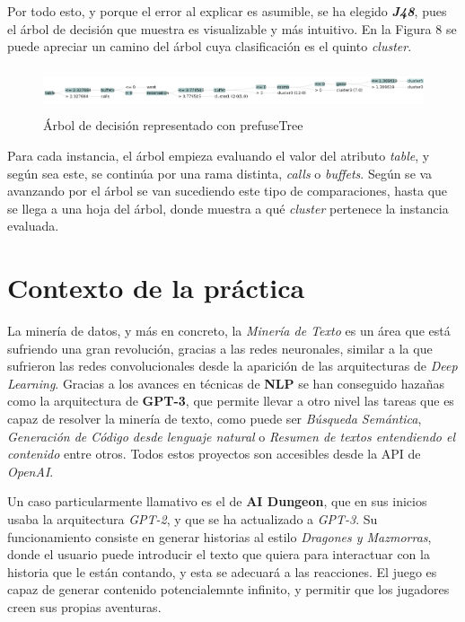 \documentclass[12pt,a4paper, xcolor=table]{article}
\begin{document}
\vspace{2mm}

Por todo esto, y porque el error al explicar es asumible, se ha elegido \textit{\textbf{J48}}, pues el árbol de decisión que muestra es visualizable y más intuitivo. En la Figura 8 se puede apreciar un camino del árbol cuya clasificación es el quinto \textit{cluster}.

\begin{figure}[!h]
  \centering
  \includegraphics[width=500px, height=50px]{img/arbol_decision.png}
  \caption{Árbol de decisión representado con prefuseTree\cite{weka}}
\end{figure}

Para cada instancia, el árbol empieza evaluando el valor del atributo \textit{table}, y según sea este, se continúa por una rama distinta, \textit{calls} o \textit{buffets}. Según se va avanzando por el árbol se van sucediendo este tipo de comparaciones, hasta que se llega a una hoja del árbol, donde muestra a qué \textit{cluster} pertenece la instancia evaluada.


\section{Contexto de la práctica}

La minería de datos, y más en concreto, la \textit{Minería de Texto} es un área que está sufriendo una gran revolución, gracias a las redes neuronales, similar a la que sufrieron las redes convolucionales desde la aparición de las arquitecturas de \textit{Deep Learning}. Gracias a los avances en técnicas de \textbf{NLP} se han conseguido hazañas como la arquitectura de \textbf{GPT-3}\cite{gpt3}, que permite llevar a otro nivel las tareas que es capaz de resolver la minería de texto, como puede ser \textit{Búsqueda Semántica}, \textit{Generación de Código desde lenguaje natural} o \textit{Resumen de textos entendiendo el contenido} entre otros. Todos estos proyectos son accesibles desde la API de \textit{OpenAI}\cite{openai}.

\vspace{3mm}

Un caso particularmente llamativo es el de \textbf{AI Dungeon}, que en sus inicios usaba la arquitectura \textit{GPT-2}, y que se ha actualizado a \textit{GPT-3}. Su funcionamiento consiste en generar historias al estilo \textit{Dragones y Mazmorras}, donde el usuario puede introducir el texto que quiera para interactuar con la historia que le están contando, y esta se adecuará a las reacciones. El juego es capaz de generar contenido potencialemnte infinito, y permitir que los jugadores creen sus propias aventuras.
\end{document}
